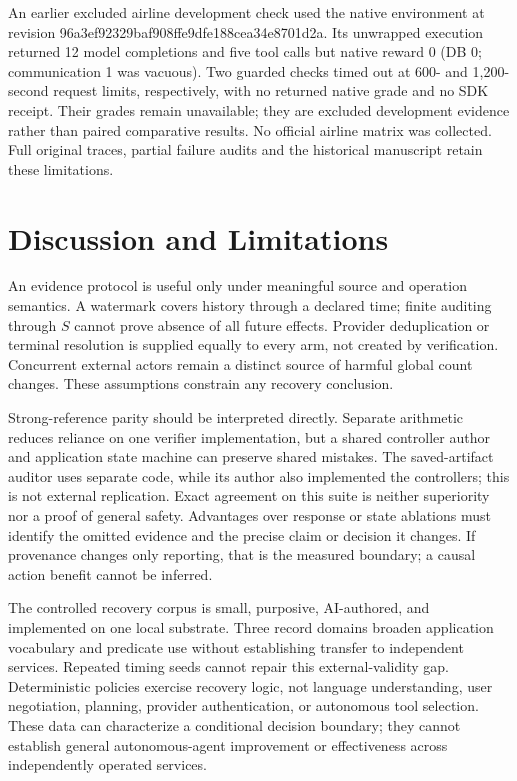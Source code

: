 \documentclass[conference]{IEEEtran}
\begin{document}
An earlier excluded airline development check used the native environment at revision 96a3ef92329baf908ffe9dfe188cea34e8701d2a. Its unwrapped execution returned 12 model completions and five tool calls but native reward 0 (DB 0; communication 1 was vacuous). Two guarded checks timed out at 600- and 1,200-second request limits, respectively, with no returned native grade and no SDK receipt. Their grades remain unavailable; they are excluded development evidence rather than paired comparative results. No official airline matrix was collected. Full original traces, partial failure audits and the historical manuscript retain these limitations.

\section{Discussion and Limitations}

An evidence protocol is useful only under meaningful source and operation semantics. A watermark covers history through a declared time; finite auditing through $S$ cannot prove absence of all future effects. Provider deduplication or terminal resolution is supplied equally to every arm, not created by verification. Concurrent external actors remain a distinct source of harmful global count changes. These assumptions constrain any recovery conclusion.

Strong-reference parity should be interpreted directly. Separate arithmetic reduces reliance on one verifier implementation, but a shared controller author and application state machine can preserve shared mistakes. The saved-artifact auditor uses separate code, while its author also implemented the controllers; this is not external replication. Exact agreement on this suite is neither superiority nor a proof of general safety. Advantages over response or state ablations must identify the omitted evidence and the precise claim or decision it changes. If provenance changes only reporting, that is the measured boundary; a causal action benefit cannot be inferred.

The controlled recovery corpus is small, purposive, AI-authored, and implemented on one local substrate. Three record domains broaden application vocabulary and predicate use without establishing transfer to independent services. Repeated timing seeds cannot repair this external-validity gap. Deterministic policies exercise recovery logic, not language understanding, user negotiation, planning, provider authentication, or autonomous tool selection. These data can characterize a conditional decision boundary; they cannot establish general autonomous-agent improvement or effectiveness across independently operated services.
\end{document}
